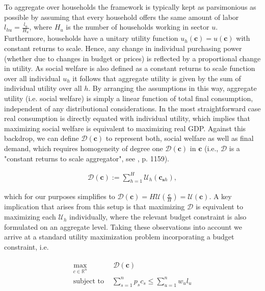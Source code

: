 \documentclass{article}
\begin{document}
To aggregate over households the framework is typically kept as parsimonious as possible by assuming that every household offers the same amount of labor $l_{hu} = \frac{l_u}{H_u}$, where $H_u$ is the number of households working in sector $u$. Furthermore, households have a unitary utility function $u_h(\mathbf c) = u(\mathbf c)$ with constant returns to scale. Hence, any change in individual purchasing power (whether due to changes in budget or prices) is reflected by a proportional change in utility. As social welfare is also defined as a constant returns to scale function over all individual $u_h$ it follows that aggregate utility is given by the sum of individual utility over all $h$. By arranging the assumptions in this way, aggregate utility (i.e. social welfare) is simply a linear function of total final consumption, independent of any distributional considerations. In the most straightforward case real consumption is directly equated with individual utility, which implies that maximizing social welfare is equivalent to maximizing real GDP. Against this backdrop, we can define $\mathcal D(\mathbf c)$ to represent both, social welfare as well as final demand, which requires homogeneity of degree one $\mathcal D(\mathbf c)$ in $\mathbf c$ (i.e., $\mathcal D$ is a "constant returns to scale aggregator", see \citealp{BF2019}, p. 1159).

\begin{align}
  \mathcal D(\mathbf c) := \sum_{h  = 1}^H \mathcal U_h(\mathbf{c}_{\mathbf{s} h}), 
\end{align}

which for our purposes simplifies to $\mathcal D(\mathbf c) =  H \mathcal U(\frac{\mathbf c}{H}) = \mathcal U(\mathbf c).$
A key implication that arises from this setup is that maximizing $\mathcal D$ is equivalent to maximizing each $\mathcal U_h$ individually, where the relevant budget constraint is also formulated on an aggregate level. Taking these observations into account we arrive at a standard utility maximization problem incorporating a budget constraint, i.e.

\begin{gather}
  \label{eq:cgutilitymax}
  \begin{split}
  \max_{c \in \mathbb R^n} & \, \mathcal D(\mathbf c)  \\
  \text{subject to } &\sum_{s=1}^n  p_s c_s  \leq \sum_{u=1}^n w_u l_u  \\
  \end{split}
\end{gather}
\end{document}
